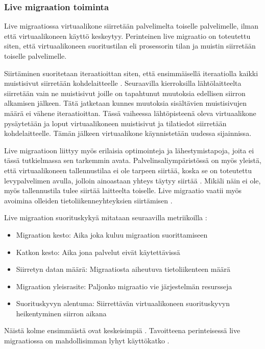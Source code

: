 \subsubsection*{Live migraation toiminta}%
Live migraatiossa virtuaalikone siirretään palvelimelta toiselle palvelimelle, ilman että virtuaalikoneen käyttö keskeytyy. 
Perinteinen live migraatio on toteutettu siten, että virtuaalikoneen suoritustilan eli prosessorin tilan ja muistin siirretään toiselle palvelimelle.

Siirtäminen suoritetaan iteraatioittan siten, että ensimmäisellä iteraatiolla kaikki muistisivut siirretään kohdelaitteelle \cite{clark2005live}.
Seuraavilla kierroksilla lähtölaitteelta siirretään vain ne muistisivut joille on tapahtunut muutoksia edellisen siirron alkamisen jälkeen. 
Tätä jatketaan kunnes muutoksia sisältävien muistisivujen määrä ei vähene iteraatioittan.
Tässä vaiheessa lähtöpisteenä oleva virtuaalikone pysäytetään ja loput virtuaalikoneen muistisivut ja tilatiedot siirretään kohdelaitteelle. Tämän jälkeen virtuaalikone käynnistetään uudessa sijainnissa. 

Live migraatioon liittyy myös erilaisia optimointeja ja lähestymistapoja, joita ei tässä tutkielmassa sen tarkemmin avata. 
Palvelinsaliympäristössä on myös yleistä, että virtuaalikoneen tallennustilaa ei ole tarpeen siirtää, koska se on toteutettu levypalvelimen avulla, jolloin ainoastaan yhteys täytyy siirtää \cite{clark2005live}. Mikäli näin ei ole, myös tallennustila tulee siirtää laitteelta toiselle.
Live migraatio vaatii myös avoimina olleiden tietoliikenneyhteyksien siirtämisen \cite{clark2005live}.

Live migraation suorituskykyä mitataan seuraavilla metriikoilla \cite{soni2013comparative}:

\begin{itemize}
	\item Migraation kesto: Aika joka kuluu migraation suorittamiseen
	\item Katkon kesto: Aika jona palvelut eivät käytettävissä
	\item Siirretyn datan määrä: Migraatiosta aiheutuva tietoliikenteen määrä
	\item Migraation yleisrasite: Paljonko migraatio vie järjestelmän resursseja
	\item Suorituskyvyn alentuma: Siirrettävän virtuaalikoneen suorituskyvyn heikentyminen siirron aikana
\end{itemize}

Näistä kolme ensimmäistä ovat keskeisimpiä \cite{farris2017lightweight}. Tavoitteena perinteisessä live migraatiossa on mahdollisimman lyhyt käyttökatko \cite{ha2015adaptive}.

